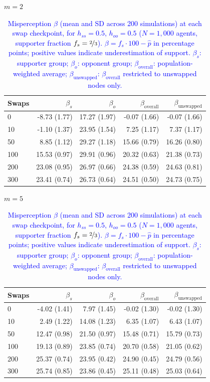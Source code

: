 \begin{table}[H]
\centering
\caption{\textcolor{blue}{Misperception $\beta$ (mean and SD across 200 simulations) at each swap checkpoint, for $h_{ss} = 0.5$, $h_{oo} = 0.5$ ($N = 1{,}000$ agents, supporter fraction $f_s = \nicefrac{2}{3}$). $\beta = f_s \cdot 100 - \hat{p}$ in percentage points; positive values indicate underestimation of support. $\beta_s$: supporter group; $\beta_o$: opponent group; $\beta_{\mathrm{overall}}$: population-weighted average; $\beta_{\mathrm{unswapped}}$: $\beta_{\mathrm{overall}}$ restricted to unswapped nodes only.}}
\label{tab:subset_fs0667_hss500_hoo500}
\par\medskip
\noindent\textit{$m = 2$}\\[2pt]
\begin{tabular}{l rrrr}
\toprule
Swaps & $\beta_s$ & $\beta_o$ & $\beta_{\mathrm{overall}}$ & $\beta_{\mathrm{unswapped}}$ \\
\midrule
0 & -8.73 (1.77) & 17.27 (1.97) & -0.07 (1.66) & -0.07 (1.66) \\
10 & -1.10 (1.37) & 23.95 (1.54) & 7.25 (1.17) & 7.37 (1.17) \\
50 & 8.85 (1.12) & 29.27 (1.18) & 15.66 (0.79) & 16.26 (0.80) \\
100 & 15.53 (0.97) & 29.91 (0.96) & 20.32 (0.63) & 21.38 (0.73) \\
200 & 23.08 (0.95) & 26.97 (0.66) & 24.38 (0.59) & 24.63 (0.81) \\
300 & 23.41 (0.74) & 26.73 (0.64) & 24.51 (0.50) & 24.73 (0.75) \\
\bottomrule
\end{tabular}
\par\medskip
\noindent\textit{$m = 5$}\\[2pt]
\begin{tabular}{l rrrr}
\toprule
Swaps & $\beta_s$ & $\beta_o$ & $\beta_{\mathrm{overall}}$ & $\beta_{\mathrm{unswapped}}$ \\
\midrule
0 & -4.02 (1.41) & 7.97 (1.45) & -0.02 (1.30) & -0.02 (1.30) \\
10 & 2.49 (1.22) & 14.08 (1.23) & 6.35 (1.07) & 6.43 (1.07) \\
50 & 12.47 (0.98) & 21.50 (0.97) & 15.48 (0.71) & 15.79 (0.73) \\
100 & 19.13 (0.89) & 23.85 (0.74) & 20.70 (0.58) & 21.05 (0.62) \\
200 & 25.37 (0.74) & 23.95 (0.42) & 24.90 (0.45) & 24.79 (0.56) \\
300 & 25.74 (0.85) & 23.86 (0.45) & 25.11 (0.48) & 25.03 (0.64) \\

\end{tabular}
\end{table}
